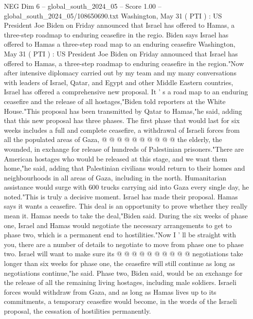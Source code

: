 \begin{textsample}{NEG Dim 6 – global\_south\_2024\_05 – Score 1.00 – global\_south\_2024\_05/108650690.txt}  \label{ex:f6_neg_288}
Washington, May 31 ( PTI ) : US President Joe Biden on Friday announced that Israel has offered to Hamas, a three-step roadmap to enduring ceasefire in the regio.
Biden says Israel has offered to Hamas a three-step road map to an enduring ceasefire Washington, May 31 ( PTI ) : US President Joe Biden on Friday announced that Israel has offered to Hamas, a three-step roadmap to enduring ceasefire in the region."Now after intensive diplomacy carried out by my team and my many conversations with leaders of Israel, Qatar, and Egypt and other Middle Eastern countries, Israel has offered a comprehensive new proposal.
It ' s a road map to an enduring ceasefire and the release of all hostages,"Biden told reporters at the White House."This proposal has been transmitted by Qatar to Hamas,"he said, adding that this new proposal has three phases.
The first phase that would last for six weeks includes a full and complete ceasefire, a withdrawal of Israeli forces from all the populated areas of Gaza, @ @ @ @ @ @ @ @ @ @ the elderly, the wounded, in exchange for release of hundreds of Palestinian prisoners."There are American hostages who would be released at this stage, and we want them home,"he said, adding that Palestinian civilians would return to their homes and neighbourhoods in all areas of Gaza, including in the north.
Humanitarian assistance would surge with 600 trucks carrying aid into Gaza every single day, he noted."This is truly a decisive moment.
Israel has made their proposal.
Hamas says it wants a ceasefire.
This deal is an opportunity to prove whether they really mean it.
Hamas needs to take the deal,"Biden said.
During the six weeks of phase one, Israel and Hamas would negotiate the necessary arrangements to get to phase two, which is a permanent end to hostilities."Now I ' ll be straight with you, there are a number of details to negotiate to move from phase one to phase two.
Israel will want to make sure its @ @ @ @ @ @ @ @ @ @ negotiations take longer than six weeks for phase one, the ceasefire will still continue as long as negotiations continue,"he said.
Phase two, Biden said, would be an exchange for the release of all the remaining living hostages, including male soldiers.
Israeli forces would withdraw from Gaza, and as long as Hamas lives up to its commitments, a temporary ceasefire would become, in the words of the Israeli proposal, the cessation of hostilities permanently.

\end{textsample}
